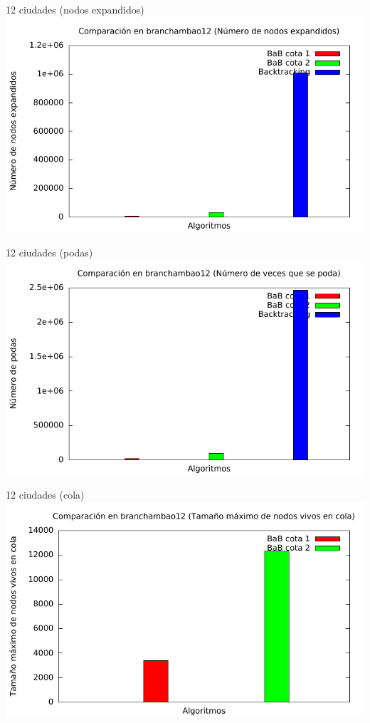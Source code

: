 \begin{frame}{12 ciudades (nodos expandidos)}
\includegraphics[width=\textwidth]{img/barras_branchambao12_nodos}
\end{frame}

\begin{frame}{12 ciudades (podas)}
\includegraphics[width=\textwidth]{img/barras_branchambao12_poda}
\end{frame}

\begin{frame}{12 ciudades (cola)}
\includegraphics[width=\textwidth]{img/barras_branchambao12_cola}
\end{frame}
